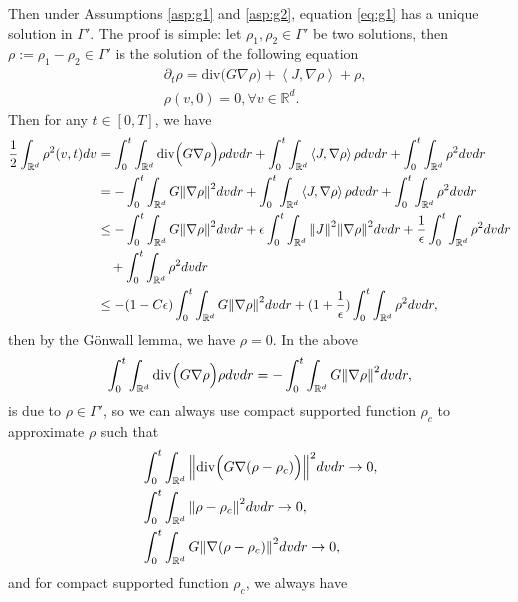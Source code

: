 \documentclass[a4paper, 11pt]{article}
\newcommand{\inner}[2]{\left< #1 , #2 \right>}
\theoremstyle{plain}
\theoremstyle{remark}
\theoremstyle{definition}
\renewcommand{\div}{\mathrm{div}}
\newcommand{\intd}{\int_{\mathbb{R}^d}}
\begin{document}
Then under Assumptions \ref{asp:g1} and \ref{asp:g2}, equation \eqref{eq:g1} has a unique solution in $\Gamma'$. The proof is simple: let $\rho_1,\rho_2\in \Gamma'$ be two solutions, then $\rho:=\rho_1-\rho_2\in\Gamma'$ is the solution of the following equation
\begin{equation}
    \begin{aligned}
        &\partial_t\rho=\div\Big(G\nabla\rho\Big)+\inner{J}{\nabla\rho}+\rho,\\
        &\rho(v,0)=0,\forall v\in \mathbb{R}^d.
    \end{aligned}
\end{equation}
Then for any $t\in [0,T]$, we have
\begin{equation}
    \begin{aligned}
        \frac{1}{2}\intd\rho^2(v,t)dv&=\int_0^t\intd \div\Big(G\nabla\rho\Big)\rho dvdr+\int_0^t\intd\inner{J}{\nabla\rho}\rho dvdr+\int_0^t\intd\rho^2dvdr\\
        &=-\int_0^t\intd G\norm{\nabla\rho}^2dvdr+\int_0^t\intd\inner{J}{\nabla\rho}\rho dvdr+\int_0^t\intd\rho^2dvdr\\
        &\leq -\int_0^t\intd G\norm{\nabla\rho}^2dvdr+\epsilon\int_0^t\intd\norm{J}^2\norm{\nabla\rho}^2dvdr+\frac{1}{\epsilon}\int_0^t\intd\rho^2 dvdr\\
        &\quad+\int_0^t\intd\rho^2dvdr\\
        &\leq -(1-C\epsilon)\int_0^t\intd G\norm{\nabla\rho}^2dvdr+(1+\frac{1}{\epsilon})\int_0^t\intd \rho^2dvdr,
    \end{aligned}
\end{equation}
then by the G\"onwall lemma, we have $\rho=0$. In the above
\begin{equation}
    \int_0^t\intd \div\Big(G\nabla\rho\Big)\rho dvdr=-\int_0^t\intd G\norm{\nabla\rho}^2dvdr,
\end{equation}
is due to $\rho\in\Gamma'$, so we can always use compact supported function $\rho_c$ to approximate $\rho$ such that
\begin{equation}
    \begin{aligned}
        &\int_0^t\intd \norm{\div\Big(G\nabla (\rho-\rho_c)\Big)}^2dvdr\to 0,\\
        &\int_0^t\intd\norm{\rho-\rho_c}^2dvdr\to 0,\\
        &\int_0^t\intd G\norm{\nabla(\rho-\rho_c)}^2dvdr\to 0,
    \end{aligned}
\end{equation}
and for compact supported function $\rho_c$, we always have 
\end{document}
